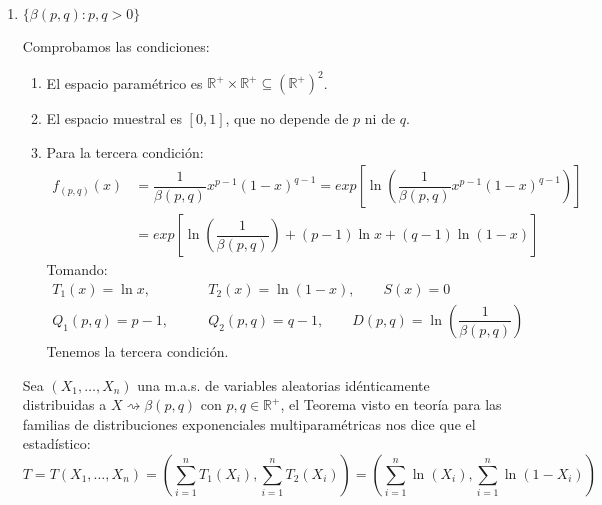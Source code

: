 \begin{ejercicio}
\begin{enumerate}[label=\alph*)]
            \begin{align*}
                Im Q = \left\{(p-1,-a) : (p,a)\in {(\mathbb{R}^+)}^{2}\right\} &= \{(x-1,y) : x\in \mathbb{R}^+, y\in \mathbb{R}^-\} \\ &= \left]-1,+\infty\right[\times \mathbb{R}^-
            \end{align*}
            Como claramente $\left]-1,+\infty\right[\times\mathbb{R}^-$ contiene un abierto de $\mathbb{R}^2$, tenemos que $T$ es completo.
        \item $\{\beta(p,q) : p,q>0\}$

            Comprobamos las condiciones:
            \begin{enumerate}[label=\arabic*.]
                \item El espacio paramétrico es $\mathbb{R}^+\times \mathbb{R}^+\subseteq {(\mathbb{R}^+)}^{2}$.
                \item El espacio muestral es $[0,1]$, que no depende de $p$ ni de $q$.
                \item Para la tercera condición:
                    \begin{align*}
                        f_{(p,q)}(x) &= \dfrac{1}{\beta(p,q)}x^{p-1}{(1-x)}^{q-1} = exp\left[\ln\left(\dfrac{1}{\beta(p,q)}x^{p-1}{(1-x)}^{q-1} \right)\right] \\
                                     &= exp\left[\ln\left(\dfrac{1}{\beta(p,q)}\right) + (p-1)\ln x + (q-1)\ln(1-x)\right]
                    \end{align*}
                Tomando:
                \begin{align*}
                    T_1(x) = \ln x, &\qquad T_2(x) = \ln(1-x), \qquad S(x) = 0 \\
                    Q_1(p,q) = p-1, &\qquad Q_2(p,q) = q-1, \qquad D(p,q) = \ln\left(\dfrac{1}{\beta(p,q)}\right) 
                \end{align*}
                Tenemos la tercera condición.
            \end{enumerate}
            Sea $(X_1, \ldots, X_n)$ una m.a.s. de variables aleatorias idénticamente distribuidas a $X\rightsquigarrow \beta(p,q)$ con $p,q\in \mathbb{R}^+$, el Teorema visto en teoría para las familias de distribuciones exponenciales multiparamétricas nos dice que el estadístico:
            \begin{equation*}
                T = T(X_1, \ldots, X_n) = \left(\sum_{i=1}^{n}T_1(X_i), \sum_{i=1}^{n}T_2(X_i)\right) = \left(\sum_{i=1}^{n}\ln(X_i), \sum_{i=1}^{n}\ln(1-X_i)\right)

\end{equation*}
\end{enumerate}
\end{ejercicio}
